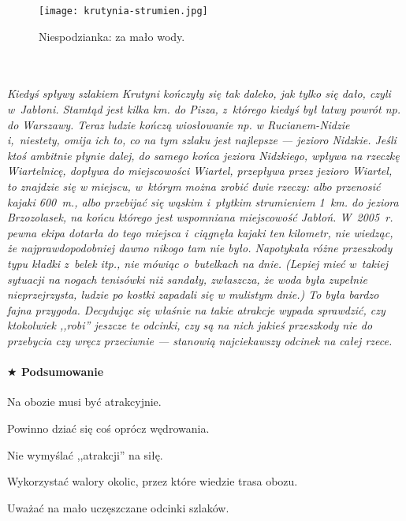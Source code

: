 \documentclass[a5paper,10pt,titlepage,twoside]{article}
\newcommand*{\thecheckbox}{\hss$\Box$} %
\newenvironment*{checklist}
{\list{}{%
\renewcommand*{\makelabel}[1]{\thecheckbox}}}
{\endlist}
\begin{document}
\begin{figure}[htp]
\centering
\texttt{[image: krutynia-strumien.jpg]}
\caption{Niespodzianka: za mało wody.}\label{fig:krutynia-strumien}
\end{figure}
\\
\\
\small{
\emph{Kiedyś spływy szlakiem Krutyni kończyły się tak daleko, jak tylko się dało, czyli w~Jabłoni. Stamtąd jest kilka km. do Pisza, z~którego kiedyś był łatwy powrót np. do Warszawy. Teraz ludzie kończą wiosłowanie np. w Rucianem-Nidzie i,~niestety, omija ich to, co na tym szlaku jest najlepsze --- jezioro Nidzkie. Jeśli ktoś ambitnie płynie dalej, do samego końca jeziora Nidzkiego, wpływa na rzeczkę Wiartelnicę, dopływa do miejscowości Wiartel, przepływa przez jezioro Wiartel, to znajdzie się w miejscu, w~którym można zrobić dwie rzeczy: albo przenosić kajaki 600~m., albo przebijać się wąskim i~płytkim strumieniem 1~km. do jeziora Brzozolasek, na końcu którego jest wspomniana miejscowość Jabłoń. W~2005~r. pewna ekipa dotarła do tego miejsca i~ciągnęła kajaki ten kilometr, nie wiedząc, że najprawdopodobniej dawno nikogo tam nie było. Napotykała różne przeszkody typu kładki z~belek itp., nie mówiąc o~butelkach na dnie. (Lepiej mieć w~takiej sytuacji na nogach tenisówki niż sandały, zwłaszcza, że woda była zupełnie nieprzejrzysta, ludzie po kostki zapadali się w mulistym dnie.) To była bardzo fajna przygoda. Decydując się właśnie na takie atrakcje wypada sprawdzić, czy ktokolwiek ,,robi'' jeszcze te odcinki, czy są na nich jakieś przeszkody nie do przebycia czy wręcz przeciwnie --- stanowią najciekawszy odcinek na całej rzece.}}

\paragraph{$\bigstar$ Podsumowanie}
\begin{checklist}
\item Na obozie musi być atrakcyjnie.
\item Powinno dziać się coś oprócz wędrowania.
\item Nie wymyślać ,,atrakcji'' na siłę.
\item Wykorzystać walory okolic, przez które wiedzie trasa obozu.
\item Uważać na mało uczęszczane odcinki szlaków.
\end{checklist}
\end{document}
